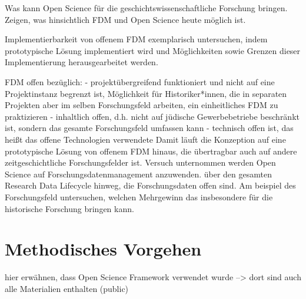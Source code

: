Was kann Open Science für die geschichtswissenschaftliche Forschung bringen. 
Zeigen, was hinsichtlich FDM und Open Science heute möglich ist.

Implementierbarkeit von offenem FDM exemplarisch untersuchen, indem prototypische Lösung implementiert wird und Möglichkeiten sowie Grenzen dieser Implementierung herausgearbeitet werden.   

FDM offen bezüglich:
- projektübergreifend funktioniert und nicht auf eine Projektinstanz begrenzt ist, Möglichkeit für Historiker*innen, die in separaten Projekten aber im selben Forschungsfeld arbeiten, ein einheitliches FDM zu praktizieren
- inhaltlich offen, d.h. nicht auf jüdische Gewerbebetriebe beschränkt ist, sondern das gesamte Forschungsfeld umfassen kann
- technisch offen ist, das heißt das offene Technologien verwendete
Damit läuft die Konzeption auf eine prototypische Lösung von offenem FDM hinaus, die übertragbar auch auf andere zeitgeschichtliche Forschungsfelder ist.
Versuch unternommen werden Open Science auf Forschungsdatenmanagement anzuwenden. über den gesamten Research Data Lifecycle hinweg, die Forschungsdaten offen sind. Am beispiel des Forschungsfeld untersuchen, welchen Mehrgewinn das insbesondere für die historische Forschung bringen kann. 

\section{Methodisches Vorgehen}

hier erwähnen, dass Open Science Framework verwendet wurde --> dort sind auch alle Materialien enthalten (public)
